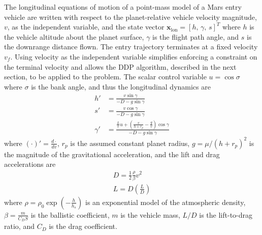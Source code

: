 \documentclass[journal ]{new-aiaa}
\newcommand{\state}{\ensuremath{\mathbf{x}}}
\begin{document}
The longitudinal equations of motion of a point-mass model of a Mars entry vehicle are written with respect to the planet-relative vehicle velocity magnitude, $v$, as the independent variable, and the state vector $\state_{\mathrm{lon}}=[h,\,\gamma,\, s]^T$ where $h$ is the vehicle altitude about the planet surface, $\gamma$ is the flight path angle, and $s$ is the downrange distance flown. The entry trajectory terminates at a fixed velocity $v_f$. Using velocity as the independent variable simplifies enforcing a constraint on the terminal velocity and allows the DDP algorithm, described in the next section, to be applied to the problem. The scalar control variable $u=\cos\sigma$ where $\sigma$ is the bank angle, and thus the longitudinal dynamics are
\begin{align}
h' &= \frac{v\sin\gamma}{-D - g\sin\gamma} \label{eq_dynamics_altitude}\\
s' &= \frac{v\cos\gamma}{-D - g\sin\gamma} \\
\gamma' &= \frac{\frac{L}{v}u + \left(\frac{v}{h+r_p}-\frac{g}{v}\right)\cos\gamma}{-D - g\sin\gamma} \label{eq_dynamics_fpa}
\end{align}
where $(\cdot)' = \frac{d\cdot}{dv}$, $r_p$ is the assumed constant planet radius, $g=\mu/(h+r_p)^2$ is the magnitude of the gravitational acceleration, and the lift and drag accelerations are
\begin{align}
D = \frac{1}{2}\frac{\rho}{\beta} v^2 \\
L = D(\frac{L}{D})
\end{align}
where $\rho=\rho_0\exp\left(-\frac{h}{h_s}\right)$ is an exponential model of the atmospheric density, $\beta=\frac{m}{C_DS}$ is the ballistic coefficient, $m$ is the vehicle mass, $L/D$ is the lift-to-drag ratio, and $C_D$ is the drag coefficient.
\end{document}
